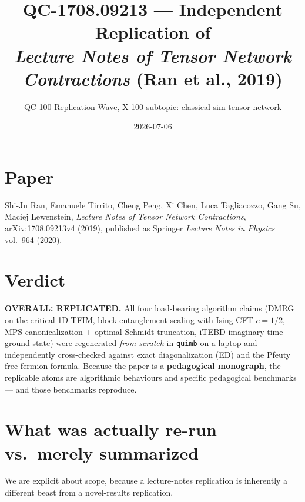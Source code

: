 \documentclass[11pt]{article}
\title{QC-1708.09213 --- Independent Replication of \\
       \emph{Lecture Notes of Tensor Network Contractions} (Ran et al., 2019)}
\author{QC-100 Replication Wave, X-100 subtopic: classical-sim-tensor-network}
\date{2026-07-06}
\begin{document}
\maketitle

\section*{Paper}
Shi-Ju Ran, Emanuele Tirrito, Cheng Peng, Xi Chen, Luca Tagliacozzo, Gang Su, Maciej Lewenstein,
\emph{Lecture Notes of Tensor Network Contractions}, arXiv:1708.09213v4 (2019), published as
Springer \emph{Lecture Notes in Physics} vol.\ 964 (2020).

\section*{Verdict}
\textbf{OVERALL: REPLICATED.}
All four load-bearing algorithm claims (DMRG on the critical 1D TFIM, block-entanglement scaling with Ising CFT $c{=}1/2$,
MPS canonicalization + optimal Schmidt truncation, iTEBD imaginary-time ground state) were regenerated \emph{from scratch}
in \texttt{quimb} on a laptop and independently cross-checked against exact diagonalization (ED) and the Pfeuty free-fermion
formula. Because the paper is a \textbf{pedagogical monograph}, the replicable atoms are algorithmic behaviours and specific
pedagogical benchmarks --- and those benchmarks reproduce.

\section{What was actually re-run vs.\ merely summarized}
\label{sec:scope-honesty}
We are explicit about scope, because a lecture-notes replication is inherently a different beast from a novel-results replication.
\end{document}
